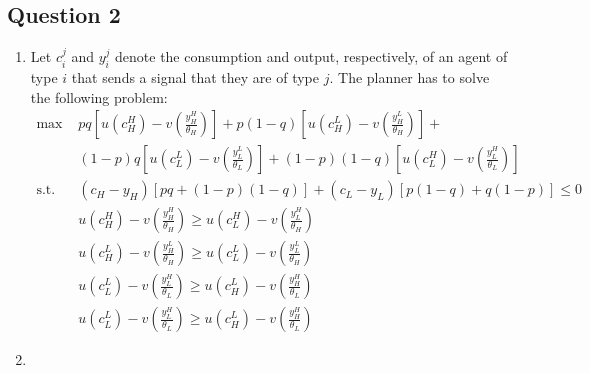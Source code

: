 \documentclass{article}
\newcommand{\usmax}[1]{\underset{#1}{\text{max }}}
\begin{document}
\pagebreak
\subsection*{Question 2}

\begin{enumerate}
	\item Let $c_i^j$ and $y_i^j$ denote the consumption and output, respectively, of an agent of type $i$ that sends a signal that they are of type $j$. The planner has to solve the following problem:
		\begin{align*}
			\usmax{}	&pq\left[u(c^H_H) - v\left(\frac{y^H_H}{\theta_H}\right)\right] 
							+ p(1-q)\left[u(c_H^L) - v\left(\frac{y_H^L}{\theta_H}\right)\right] + 												\\
						&(1-p)q\left[u(c^L_L) - v\left(\frac{y^L_L}{\theta_L}\right)\right] 
							+ (1-p)(1-q)\left[u(c^H_L) - v\left(\frac{y^H_L}{\theta_L}\right)\right]											\\
						\text{s.t. }	& (c_H-y_H)[pq + (1-p)(1-q)] + (c_L-y_L)[p(1-q) + q(1-p)] \leq 0										\\
										& u(c^H_H) - v\left(\frac{y^H_H}{\theta_H}\right) \geq u(c^H_L) - v\left(\frac{y^H_L}{\theta_H}\right)	\\
										& u(c^L_H) - v\left(\frac{y^L_H}{\theta_H}\right) \geq u(c^L_L) - v\left(\frac{y^L_L}{\theta_H}\right)	\\
										& u(c^L_L) - v\left(\frac{y^H_L}{\theta_L}\right) \geq u(c^L_H) - v\left(\frac{y^H_H}{\theta_L}\right)	\\
										& u(c^L_L) - v\left(\frac{y^H_L}{\theta_L}\right) \geq u(c^L_H) - v\left(\frac{y^H_H}{\theta_L}\right)	
		\end{align*}
	
	\item 
	
\end{enumerate}


\end{document}
